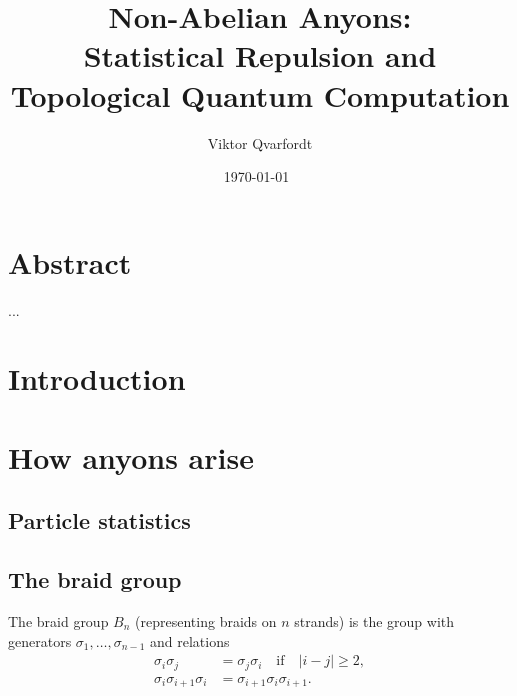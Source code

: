 \documentclass[a4paper,10pt,oneside]{book}
\theoremstyle{plain}
\theoremstyle{definition}
\theoremstyle{remark}
\begin{document}
\title{Non-Abelian Anyons:\\Statistical Repulsion and\\Topological Quantum Computation}
\author{Viktor Qvarfordt}
\date{\isodate\today\ \currenttime}


\maketitle

\chapter*{Abstract}

...

\tableofcontents

\newpage






















\chapter{Introduction}

\chapter{How anyons arise}\label{chap:how anyons arise}

\section{Particle statistics}

\section{The braid group}\label{sec:braid group}

The braid group $B_n$ (representing braids on $n$ strands) is the group with generators $σ_1, \ldots, σ_{n-1}$ and relations
\begin{subequations}
\label{eq:braid relations}
  \begin{align}
    \label{eq:braid relation 1}
    σ_i σ_j &= σ_j σ_i \quad\text{if}\quad |i-j| \ge 2, \\
    \label{eq:braid relation 2}
    σ_i σ_{i+1} σ_i &= σ_{i+1} σ_i σ_{i+1}.
  \end{align}
\end{subequations}
\end{document}
